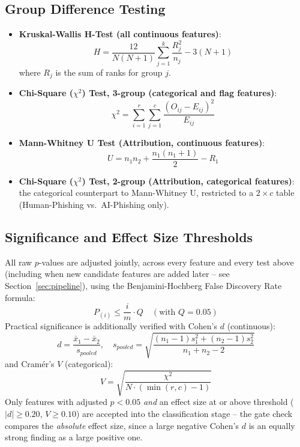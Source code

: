\documentclass[11pt]{article}
\begin{document}
\subsection{Group Difference Testing}
\begin{itemize}
    \item \textbf{Kruskal-Wallis H-Test (all continuous features)}:
      \begin{equation}
        H = \frac{12}{N(N+1)} \sum_{j=1}^{k} \frac{R_j^2}{n_j} - 3(N+1)
        \label{eq:kw}
      \end{equation}
      where $R_j$ is the sum of ranks for group $j$.

    \item \textbf{Chi-Square ($\chi^2$) Test, 3-group (categorical and flag features)}:
      \begin{equation}
        \chi^2 = \sum_{i=1}^{r}\sum_{j=1}^{c} \frac{(O_{ij}-E_{ij})^2}{E_{ij}}
        \label{eq:chisq3}
      \end{equation}

    \item \textbf{Mann-Whitney U Test (Attribution, continuous features)}:
      \begin{equation}
        U = n_1 n_2 + \frac{n_1(n_1+1)}{2} - R_1
        \label{eq:mwu}
      \end{equation}

    \item \textbf{Chi-Square ($\chi^2$) Test, 2-group (Attribution, categorical features)}: the
      categorical counterpart to Mann-Whitney U, restricted to a $2 \times c$ table
      (Human-Phishing vs.\ AI-Phishing only).
\end{itemize}

\subsection{Significance and Effect Size Thresholds}
All raw $p$-values are adjusted jointly, across every feature and every test above (including
when new candidate features are added later -- see Section~\ref{sec:pipeline}), using the
Benjamini-Hochberg False Discovery Rate formula:
\begin{equation}
    P_{(i)} \leq \frac{i}{m}\cdot Q \quad (\text{with } Q = 0.05)
    \label{eq:fdr}
\end{equation}
Practical significance is additionally verified with Cohen's $d$ (continuous):
\begin{equation}
    d = \frac{\bar{x}_1 - \bar{x}_2}{s_{pooled}}, \quad
    s_{pooled} = \sqrt{\frac{(n_1-1)s_1^2 + (n_2-1)s_2^2}{n_1+n_2-2}}
    \label{eq:cohend}
\end{equation}
and Cram\'er's $V$ (categorical):
\begin{equation}
    V = \sqrt{\frac{\chi^2}{N \cdot (\min(r,c)-1)}}
    \label{eq:cramersv}
\end{equation}
Only features with adjusted $p < 0.05$ \emph{and} an effect size at or above threshold
($|d| \geq 0.20$, $V \geq 0.10$) are accepted into the classification stage -- the gate check
compares the \emph{absolute} effect size, since a large negative Cohen's $d$ is an equally strong
finding as a large positive one.
\end{document}
